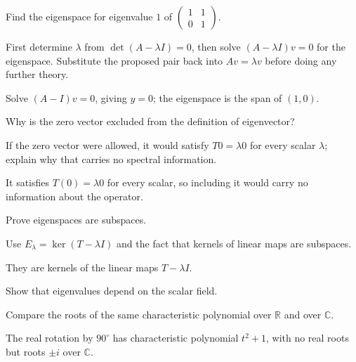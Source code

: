 \begin{exercise}\label{exr:i09-02}
Find the eigenspace for eigenvalue $1$ of $\begin{pmatrix}1&1\\0&1\end{pmatrix}$.
\end{exercise}
\begin{hint}
First determine \(\lambda\) from \(\det(A-\lambda I)=0\), then solve \((A-\lambda I)v=0\) for the eigenspace. Substitute the proposed pair back into \(Av=\lambda v\) before doing any further theory.
\end{hint}
\begin{solution}
Solve $(A-I)v=0$, giving $y=0$; the eigenspace is the span of $(1,0)$.
\end{solution}

\begin{exercise}\label{exr:i09-03}
Why is the zero vector excluded from the definition of eigenvector?
\end{exercise}
\begin{hint}
If the zero vector were allowed, it would satisfy \(T0=\lambda0\) for every scalar \(\lambda\); explain why that carries no spectral information.
\end{hint}
\begin{solution}
It satisfies $T(0)=\lambda0$ for every scalar, so including it would carry no information about the operator.
\end{solution}

\begin{exercise}\label{exr:i09-04}
Prove eigenspaces are subspaces.
\end{exercise}
\begin{hint}
Use \(E_\lambda=\ker(T-\lambda I)\) and the fact that kernels of linear maps are subspaces.
\end{hint}
\begin{solution}
They are kernels of the linear maps $T-\lambda I$.
\end{solution}

\begin{exercise}\label{exr:i09-05}
Show that eigenvalues depend on the scalar field.
\end{exercise}
\begin{hint}
Compare the roots of the same characteristic polynomial over \(\mathbb R\) and over \(\mathbb C\).
\end{hint}
\begin{solution}
The real rotation by $90^\circ$ has characteristic polynomial $t^2+1$, with no real roots but roots $\pm i$ over $\mathbb C$.
\end{solution}

